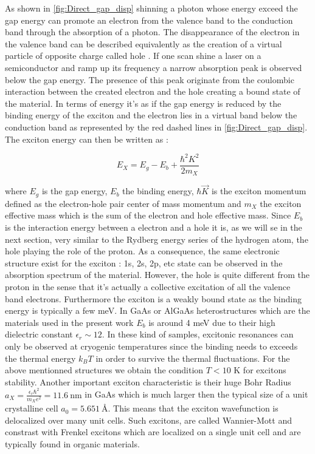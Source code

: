 \label{sub:exciton}

As shown in \autoref{fig:Direct_gap_disp} shinning a photon whose energy exceed the gap energy can promote an electron from the valence band to the conduction band through the absorption of a photon. 
The disappearance of the electron in the valence band can be described equivalently as the creation of a virtual particle of opposite charge called hole \cite{Combescot_cooper_excitons_2015}.
 If one scan shine a laser on a semiconductor and ramp up its frequency a narrow absorption peak is observed below the gap energy.  The presence of this peak originate from the coulombic interaction between the created electron and the hole creating a bound state of the material. In terms of energy it's as if the gap energy is reduced by the binding energy of the exciton and the electron lies in a virtual band below the conduction band as represented by the red dashed lines in \autoref{fig:Direct_gap_disp}.
 The exciton energy can then be written as : 

\begin{equation}
    E_{X} = E_g - E_b + \frac{\hbar^2 K^2}{2m_{X}}
\end{equation}

where $E_g$ is the gap energy, $E_b$ the binding energy,  $\hbar \vec{K}$ is the exciton momentum defined as the electron-hole pair center of mass momentum and $m_{X}$ the exciton effective mass which is the sum of the electron and hole effective mass.
Since $E_b$ is the interaction energy between a electron and a hole it is, as we will se in the next section, very similar to the Rydberg energy series of the hydrogen atom, the hole playing the role of the proton. As a consequence, the same electronic structure exist for the exciton : 1s, 2s, 2p, etc state can be observed in the absorption spectrum of the material.
However, the hole is quite different from the proton in the sense that it's actually a collective excitation of all the valence band electrons. Furthermore the exciton is a weakly bound state as the binding energy is typically a few meV. In GaAs or AlGaAs heterostructures which are the materials used in the present work $E_b$ is around 4 meV due to their high dielectric constant $\epsilon_r \sim 12$.
In these kind of samples, excitonic resonances can only be observed at cryogenic temperatures since the binding needs to exceeds the thermal energy $k_B T$ in order to survive the thermal fluctuations. For the above mentionned structures we obtain the condition $T<10$ K for excitons stability.
Another important exciton characteristic is their huge Bohr Radius $a_X= \frac{\epsilon_r \hbar^2}{m_X e^2}= 11.6 \ \mathrm{nm}$ in GaAs which  is much larger then the typical size of a unit crystalline cell $a_0 = 5.65 \SI{1}{\angstrom}$. This means that the exciton wavefunction is delocalized over many unit cells. Such excitons, are called Wannier-Mott and constrast with Frenkel excitons which are localized on a single unit cell and are typically found in organic materials.
 \bigskip\noindent

